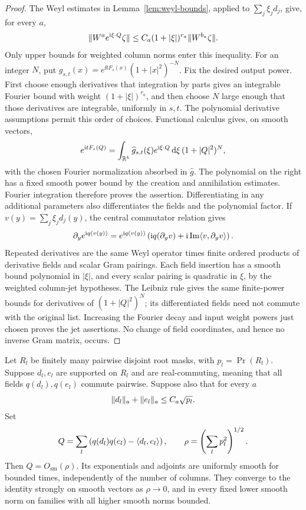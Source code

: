 \begin{proof}
The Weyl estimates in Lemma~\ref{lem:weyl-bounds}, applied to
\(\sum_j\xi_jd_j\), give, for every \(a\),
\[
 \lVert W^a e^{\mathrm i\xi\cdot Q}\zeta\rVert
 \le C_a(1+|\xi|)^{r_a}\lVert W^{b_a}\zeta\rVert.
\]
Only upper bounds for weighted column norms enter this inequality.
For an integer \(N\), put
\(g_{s,t}(x)=e^{\ii tF_s(x)}(1+|x|^2)^{-N}\).
Fix the desired output power.  First choose enough derivatives that
integration by parts gives an integrable Fourier bound with weight
\((1+|\xi|)^{r_a}\), and then choose \(N\) large enough that those
derivatives are integrable, uniformly in \(s,t\).  The polynomial
derivative assumptions permit this order of choices.  Functional
calculus gives, on smooth vectors,
\[
 e^{\mathrm i tF_s(Q)}
  =\int_{\mathbb R^k}\widehat g_{s,t}(\xi)
        e^{\mathrm i\xi\cdot Q}\,\mathrm d\xi\,(1+|Q|^2)^N,
\]
with the chosen Fourier normalization absorbed in \(\widehat g\).
The polynomial on the right has a fixed smooth power bound by the
creation and annihilation estimates.  Fourier integration therefore
proves the assertion.  Differentiating in any additional parameters
also differentiates the fields and the polynomial factor.  If
\(v(y)=\sum_j\xi_jd_j(y)\), the central commutator relation gives
\begin{equation}
 \partial_y e^{\mathrm i q(v(y))}
   =e^{\mathrm i q(v(y))}
       \left(\mathrm i q(\partial_yv)
                 +\mathrm i\operatorname{Im}\langle v,\partial_yv\rangle\right).
 \label{eq:moving-column-weyl-derivative}
\end{equation}
Repeated derivatives are the same Weyl operator times finite ordered
products of derivative fields and scalar Gram pairings.  Each field
insertion has a smooth bound polynomial in \(|\xi|\), and every
scalar pairing is quadratic in \(\xi\), by the weighted column-jet
hypotheses.  The Leibniz rule gives the same finite-power bounds for
derivatives of \((1+|Q|^2)^N\); its differentiated fields need not
commute with the original list.  Increasing the Fourier decay and
input weight powers just chosen proves the jet assertions.  No
change of field coordinates, and hence no inverse Gram matrix,
occurs.
\end{proof}

\begin{lemma}
\label{lem:orthogonal-quadratics}
Let \(R_l\) be finitely many pairwise disjoint root masks, with
\(p_l=\Pr(R_l)\). Suppose \(d_l,e_l\) are supported on \(R_l\)
and are real-commuting, meaning that all fields \(q(d_l),q(e_l)\)
commute pairwise. Suppose also that for every \(a\)
\[
 \lVert d_l\rVert_a+\lVert e_l\rVert_a\le C_a\sqrt{p_l}.
\]
Set
\[
 Q=\sum_l\left(q(d_l)q(e_l)-\langle d_l,e_l\rangle\right),
 \qquad \rho=\left(\sum_l p_l^2\right)^{1/2}.
\]
Then \(Q=O_{\mathrm{sm}}(\rho)\).  Its exponentials and adjoints
are uniformly smooth for bounded times, independently of the number
of columns.  They converge to the identity strongly on smooth vectors
as \(\rho\to0\), and in every fixed lower smooth norm on families
with all higher smooth norms bounded.
\end{lemma}

